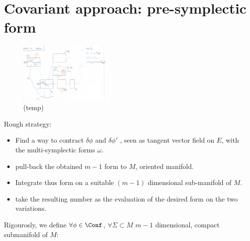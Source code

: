 \documentclass[a4paper,12pt,fleqn]{scrartcl}  %
\begin{document}
\clearpage \newpage
\section{Covariant approach: pre-symplectic form}
\begin{figure}
\centering
\includegraphics[width=0.40\textwidth]{Pictures/symform.png}
  \caption{(temp)}
\end{figure}

Rough strategy:
\begin{itemize}
	\item Find a way to contract $\delta \phi$ and $\delta \phi '$ , seen as tangent vector field on $E$, with the multi-symplectic forms $\omega$.
	\item pull-back the obtained $m-1$ form to $M$, oriented manifold.
	\item Integrate thus form on a suitable $(m-1)$ dimensional sub-manifold of $M$.
	\item take the resulting number as the evaluation of the desired form on the two variations.  
\end{itemize}

Rigourosly, we define $\forall \phi \in \Conf$, $\forall \Sigma \subset M$ $m-1$ dimensional, compact submanifold of $M$:
\end{document}
